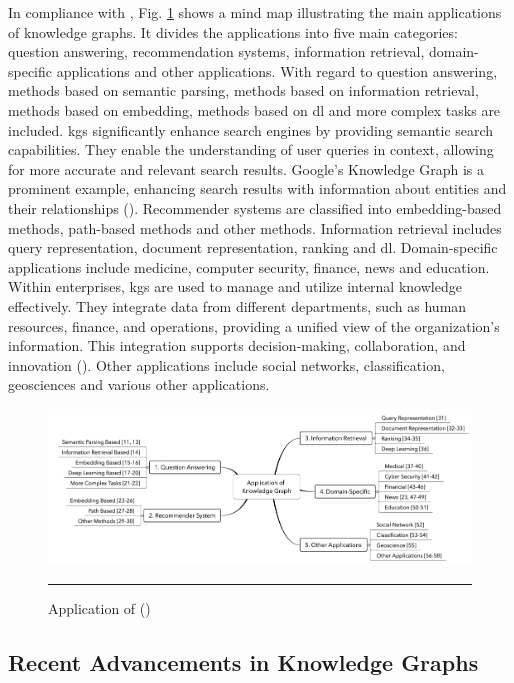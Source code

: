 In compliance with \cite{Zou2020}, Fig. \ref{fig:kg-application-fields} shows a mind map illustrating the main applications of knowledge graphs. It divides the applications into five main categories: question answering, recommendation systems, information retrieval, domain-specific applications and other applications. With regard to question answering, methods based on semantic parsing, methods based on information retrieval, methods based on embedding, methods based on \gls{dl} and more complex tasks are included.
\glspl{kg} significantly enhance search engines by providing semantic search capabilities. They enable the understanding of user queries in context, allowing for more accurate and relevant search results. Google's Knowledge Graph is a prominent example, enhancing search results with information about entities and their relationships (\cite{singhal2012introducing}).
Recommender systems are classified into embedding-based methods, path-based methods and other methods. Information retrieval includes query representation, document representation, ranking and \gls{dl}. Domain-specific applications include medicine, computer security, finance, news and education.
Within enterprises, \glspl{kg} are used to manage and utilize internal knowledge effectively. They integrate data from different departments, such as human resources, finance, and operations, providing a unified view of the organization's information. This integration supports decision-making, collaboration, and innovation (\cite{pujara2013knowledge}).
Other applications include social networks, classification, geosciences and various other applications.

\begin{figure}[htbp]
	   \centering
    \includegraphics[width=\textwidth]{03_Figures/literature-review/kg-application-fields.png}
		\rule{35em}{0.5pt}
	   \caption{Application of  (\cite{Zou2020})} 
    \label{fig:kg-application-fields}
\end{figure}

\subsection*{Recent Advancements in Knowledge Graphs}

